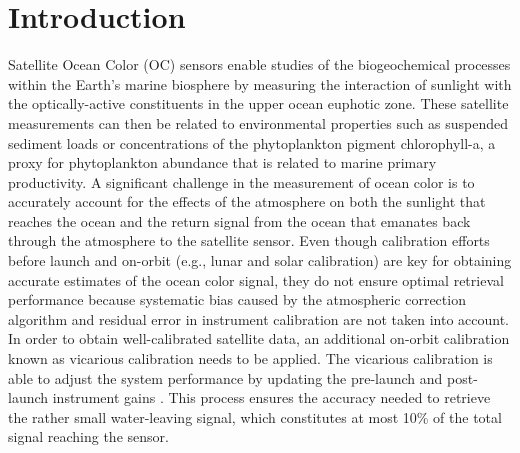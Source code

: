 \documentclass[10pt]{article}
\begin{document}
 






\section{Introduction}
Satellite Ocean Color (OC) sensors enable studies of the biogeochemical processes within the Earth's marine biosphere by measuring the interaction of sunlight with the optically-active constituents in the upper ocean euphotic zone. These satellite measurements can then be related to environmental properties such as suspended sediment loads or concentrations of the phytoplankton pigment chlorophyll-a, a proxy for phytoplankton abundance that is related to marine primary productivity. A significant challenge in the measurement of ocean color is to accurately account for the effects of the atmosphere on both the sunlight that reaches the ocean and the return signal from the ocean that emanates back through the atmosphere to the satellite sensor.  Even though calibration efforts before launch and on-orbit (e.g., lunar and solar calibration) are key for obtaining accurate estimates of the ocean color signal, they do not ensure optimal retrieval performance because systematic bias caused by the atmospheric correction algorithm and residual error in instrument calibration are not taken into account. In order to obtain well-calibrated satellite data, an additional on-orbit calibration known as vicarious calibration needs to be applied. The vicarious calibration is able to adjust the system performance by updating the pre-launch and post-launch instrument gains \cite{Franz:07}. This process ensures the accuracy needed to retrieve the rather small water-leaving signal, which constitutes at most 10\% of the total signal reaching the sensor. 
\end{document}
